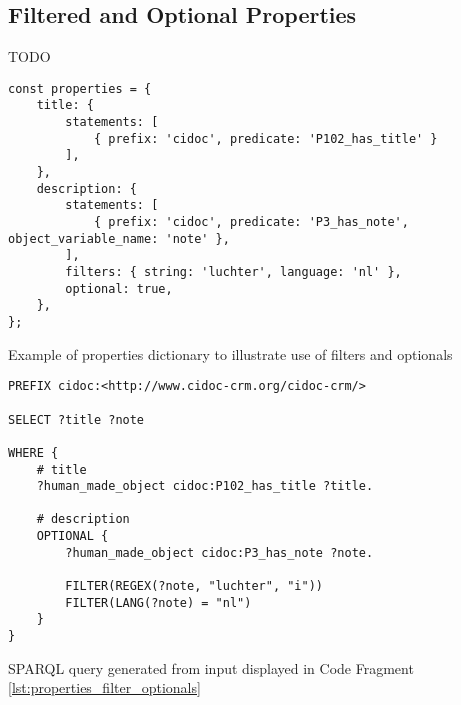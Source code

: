 \subsection{Filtered and Optional Properties}

TODO

%


\begin{listing}[htbp]
    \begin{verbatim}
const properties = {
    title: {
        statements: [
            { prefix: 'cidoc', predicate: 'P102_has_title' }
        ],
    },
    description: {
        statements: [
            { prefix: 'cidoc', predicate: 'P3_has_note', object_variable_name: 'note' },
        ],
        filters: { string: 'luchter', language: 'nl' },
        optional: true,
    },
};
    \end{verbatim}
    \caption{Example of properties dictionary to illustrate use of filters and optionals}
    \label{lst:properties_filter_optionals}
\end{listing}
\begin{listing}[htbp]
    \begin{verbatim}
PREFIX cidoc:<http://www.cidoc-crm.org/cidoc-crm/>

SELECT ?title ?note

WHERE {
    # title
    ?human_made_object cidoc:P102_has_title ?title.
    
    # description
    OPTIONAL {
        ?human_made_object cidoc:P3_has_note ?note.
        
        FILTER(REGEX(?note, "luchter", "i"))
        FILTER(LANG(?note) = "nl")
    }
}
    \end{verbatim}
    \caption{SPARQL query generated from input displayed in Code Fragment \ref{lst:properties_filter_optionals}}
    \label{lst:query_generated_filters_optionals}
\end{listing}

